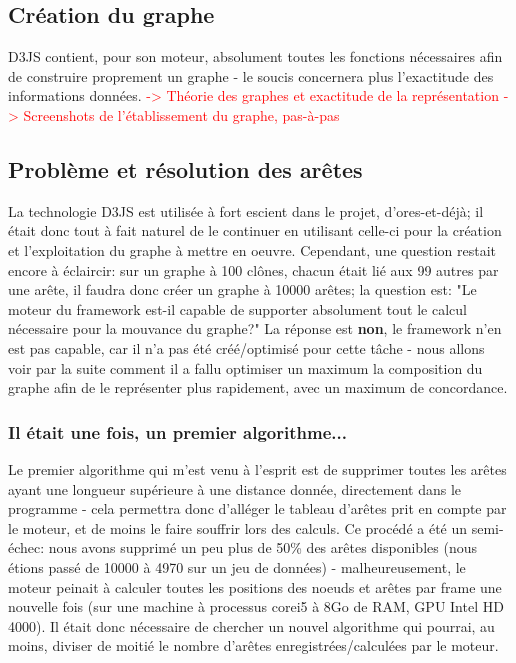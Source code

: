 \documentclass{report}
\begin{document}
\subsection{Création du graphe}
D3JS contient, pour son moteur, absolument toutes les fonctions nécessaires afin de construire proprement un graphe - le soucis concernera plus l'exactitude des informations données.
\newline
\textcolor{red}{-> Théorie des graphes et exactitude de la représentation}
\newline
\textcolor{red}{-> Screenshots de l'établissement du graphe, pas-à-pas}

\subsection{Problème et résolution des arêtes}
La technologie D3JS est utilisée à fort escient dans le projet, d'ores-et-déjà; il était donc tout à fait naturel de le continuer en utilisant celle-ci pour la création et l'exploitation du graphe à mettre en oeuvre.
\newline
Cependant, une question restait encore à éclaircir: sur un graphe à 100 clônes, chacun était lié aux 99 autres par une arête, il faudra donc créer un graphe à 10000 arêtes; la question est: "Le moteur du framework est-il capable de supporter absolument tout le calcul nécessaire pour la mouvance du graphe?"
\newline
La réponse est \textbf{non}, le framework n'en est pas capable, car il n'a pas été créé/optimisé pour cette tâche - nous allons voir par la suite comment il a fallu optimiser un maximum la composition du graphe afin de le représenter plus rapidement, avec un maximum de concordance.

\subsubsection{Il était une fois, un premier algorithme...}
Le premier algorithme qui m'est venu à l'esprit est de supprimer toutes les arêtes ayant une longueur supérieure à une distance donnée, directement dans le programme - cela permettra donc d'alléger le tableau d'arêtes prit en compte par le moteur, et de moins le faire souffrir lors des calculs.
\newline
Ce procédé a été un semi-échec: nous avons supprimé un peu plus de 50\% des arêtes disponibles (nous étions passé de 10000 à 4970 sur un jeu de données) - malheureusement, le moteur peinait à calculer toutes les positions des noeuds et arêtes par frame une nouvelle fois (sur une machine à processus corei5 à 8Go de RAM, GPU Intel HD 4000).
\newline
Il était donc nécessaire de chercher un nouvel algorithme qui pourrai, au moins, diviser de moitié le nombre d'arêtes enregistrées/calculées par le moteur.
\end{document}

